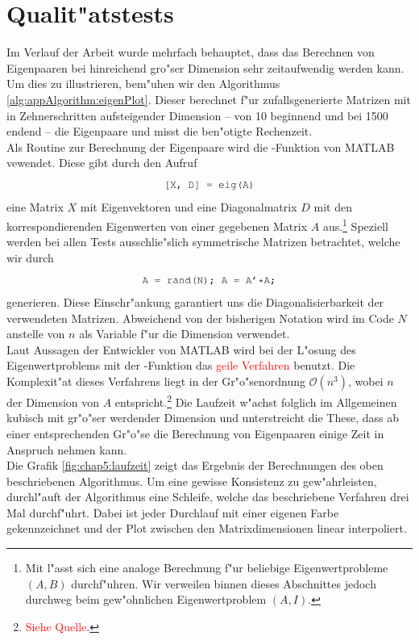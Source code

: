 \newpage
\section{Qualit"atstests}
Im Verlauf der Arbeit wurde mehrfach behauptet, dass das Berechnen von Eigenpaaren bei hinreichend gro"ser Dimension sehr zeitaufwendig werden kann. Um dies zu illustrieren, bem"uhen wir den Algorithmus \ref{alg:appAlgorithm:eigenPlot}. Dieser berechnet f"ur zufallsgenerierte Matrizen mit in Zehnerschritten aufsteigender Dimension -- von 10 beginnend und bei 1500 endend -- die Eigenpaare und misst die ben"otigte Rechenzeit.\\

Als Routine zur Berechnung der Eigenpaare wird die -Funktion von MATLAB vewendet. Diese gibt durch den Aufruf
\[
\mcode{[X, D] = eig(A)}
\]
eine Matrix $X$ mit Eigenvektoren und eine Diagonalmatrix $D$ mit den korrespondierenden Eigenwerten von einer gegebenen Matrix $A$ aus.\footnote{Mit  l"asst sich eine analoge Berechnung f"ur beliebige Eigenwertprobleme $(A,B)$ durchf"uhren. Wir verweilen binnen dieses Abschnittes jedoch durchweg beim gew"ohnlichen Eigenwertproblem $(A,I)$.} Speziell werden bei allen Tests ausschlie"slich symmetrische Matrizen betrachtet, welche wir durch
\[
\mcode{A = rand(N); A = A'*A;}
\]
generieren. Diese Einschr"ankung garantiert uns die Diagonalisierbarkeit der verwendeten Matrizen. Abweichend von der bisherigen Notation wird im Code $N$ anstelle von $n$ als Variable f"ur die Dimension verwendet.\\

Laut Aussagen der Entwickler von MATLAB wird bei der L"osung des Eigenwertproblems mit der -Funktion das \textcolor{red}{geile Verfahren} benutzt. Die Komplexit"at dieses Verfahrens liegt in der Gr"o"senordnung $\mathcal{O}(n^3)$, wobei $n$ der Dimension von $A$ entspricht.\footnote{\textcolor{red}{Siehe Quelle}.} Die Laufzeit w"achst folglich im Allgemeinen kubisch mit gr"o"ser werdender Dimension und unterstreicht die These, dass ab einer entsprechenden Gr"o"se die Berechnung von Eigenpaaren einige Zeit in Anspruch nehmen kann.\\

Die Grafik \ref{fig:chap5:laufzeit} zeigt das Ergebnis der Berechnungen des oben beschriebenen Algorithmus.
Um eine gewisse Konsistenz zu gew"ahrleisten, durchl"auft der Algorithmus eine Schleife, welche das beschriebene Verfahren drei Mal durchf"uhrt. Dabei ist jeder Durchlauf mit einer eigenen Farbe gekennzeichnet und der Plot zwischen den Matrixdimensionen linear interpoliert.\\

